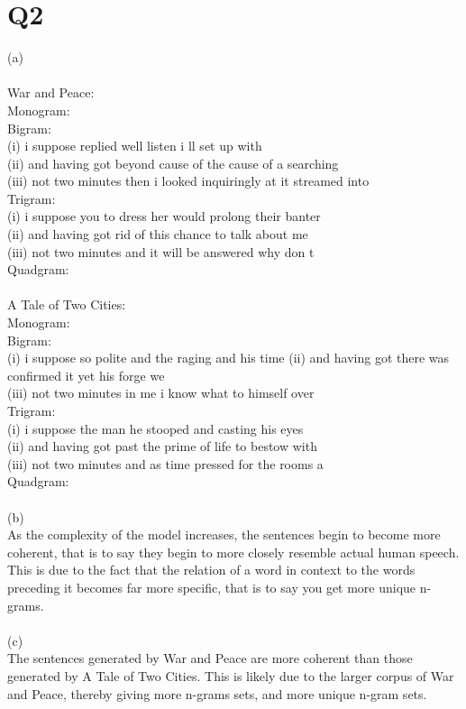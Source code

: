 \documentclass{article}
\begin{document}
\section{Q2}
(a)\\\\
War and Peace:\\
Monogram:\\
Bigram:\\
(i) i suppose replied well listen i ll set up with\\
(ii) and having got beyond cause of the cause of a searching\\
(iii) not two minutes then i looked inquiringly at it streamed into\\
Trigram:\\
(i) i suppose you to dress her would prolong their banter\\
(ii) and having got rid of this chance to talk about me\\
(iii) not two minutes and it will be answered why don t\\
Quadgram:\\\\
A Tale of Two Cities:\\
Monogram:\\
Bigram:\\
(i) i suppose so polite and the raging and his time
(ii) and having got there was confirmed it yet his forge we\\
(iii) not two minutes in me i know what to himself over\\
Trigram:\\
(i) i suppose the man he stooped and casting his eyes\\
(ii) and having got past the prime of life to bestow with\\
(iii) not two minutes and as time pressed for the rooms a\\
Quadgram:\\\\
(b)\\
As the complexity of the model increases, the sentences begin to become more coherent, that is to say they begin to more closely resemble actual human speech. This is due to the fact that the relation of a word in context to the words preceding it becomes far more specific, that is to say you get more unique n-grams.\\\\
(c)\\
The sentences generated by War and Peace are more coherent than those generated by A Tale of Two Cities. This is likely due to the larger corpus of War and Peace, thereby giving more n-grams sets, and more unique n-gram sets. 
\end{document}
